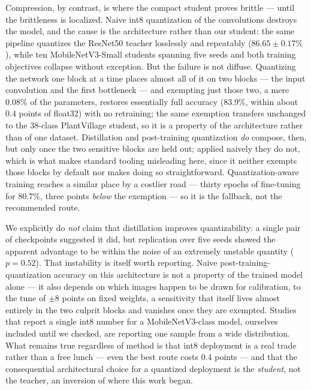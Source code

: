 \documentclass[conference]{IEEEtran}
\begin{document}
Compression, by contrast, is where the compact student proves brittle --- until
the brittleness is localized. Naive int8 quantization of the convolutions destroys
the model, and the cause is the architecture rather than our student: the same
pipeline quantizes the ResNet50 teacher losslessly and repeatably
($86.65\pm0.17\%$), while ten MobileNetV3-Small students spanning five seeds and
both training objectives collapse without exception. But the failure is not
diffuse. Quantizing the network one block at a time places almost all of it on two
blocks --- the input convolution and the first bottleneck --- and exempting just
those two, a mere $0.08\%$ of the parameters, restores essentially full accuracy
($83.9\%$, within about $0.4$ points of float32) with no retraining; the same exemption
transfers unchanged to the 38-class PlantVillage student, so it is a property of
the architecture rather than of one dataset. Distillation and
post-training quantization \emph{do} compose, then, but only once the two
sensitive blocks are held out; applied naively they do not, which is what makes
standard tooling misleading here, since it neither exempts those blocks by default
nor makes doing so straightforward. Quantization-aware training reaches a similar
place by a costlier road --- thirty epochs of fine-tuning for $80.7\%$, three
points \emph{below} the exemption --- so it is the fallback, not the recommended
route.

We explicitly do \emph{not} claim that distillation improves quantizability: a
single pair of checkpoints suggested it did, but replication over five seeds showed
the apparent advantage to be within the noise of an extremely unstable quantity
($p=0.52$). That instability is itself worth reporting. Naive post-training-
quantization accuracy on this architecture is not a property of the trained model
alone --- it also depends on which images happen to be drawn for calibration, to
the tune of $\pm8$ points on fixed weights, a sensitivity that itself lives almost
entirely in the two culprit blocks and vanishes once they are exempted. Studies
that report a single int8 number for a MobileNetV3-class model, ourselves included
until we checked, are reporting one sample from a wide distribution. What remains
true regardless of method is that int8 deployment is a real trade rather than a
free lunch --- even the best route costs $0.4$ points --- and that the
consequential architectural choice for a quantized deployment is the
\emph{student}, not the teacher, an inversion of where this work began.
\end{document}
